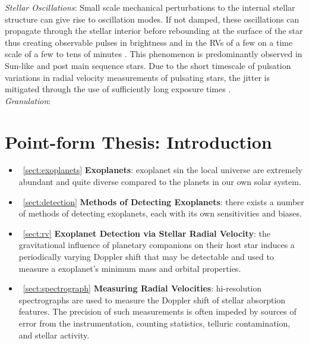 \emph{Stellar Oscillations}:
Small scale mechanical perturbations to the internal stellar structure
can give rise to oscillation modes. If not damped, these oscillations
can propagate through the stellar interior before rebounding at the surface
of the star thus creating observable pulses in brightness and in the RVs of a
few \mps{} on a time scale of a few to tens of minutes \citep{bedding01}. 
This phenomenon is predominantly observed in Sun-like and post main sequence stars.
Due to the short timescale of
pulsation variations in radial velocity measurements of pulsating stars, the
jitter is mitigated through the use of sufficiently long exposure times
\citep{lovis05, dumusque11}. \\


\emph{Granulation}:




\section{Point-form Thesis: Introduction}
\begin{itemize}
\renewcommand\labelitemi{--}
\item~\ref{sect:exoplanets} \textbf{Exoplanets}: exoplanet sin the local universe are 
extremely abundant and quite diverse compared to the planets in our own solar system.
\item~\ref{sect:detection} \textbf{Methods of Detecting Exoplanets}: there exists a 
number of methods of detecting exoplanets, each with its own sensitivities and biases.
\item~\ref{sect:rv} \textbf{Exoplanet Detection via Stellar Radial Velocity}: the 
  gravitational influence of planetary companions on their host star induces a periodically
  varying Doppler shift that may be detectable and used to measure a exoplanet's minimum mass
  and orbital properties.
\item~\ref{sect:spectrograph} \textbf{Measuring Radial Velocities}: hi-resolution 
  spectrographs are used to measure the Doppler shift of stellar absorption features.
  The precision of such measurements is often impeded by sources of error from the
  instrumentation, counting statistics, telluric contamination, and stellar activity.
\end{itemize}
